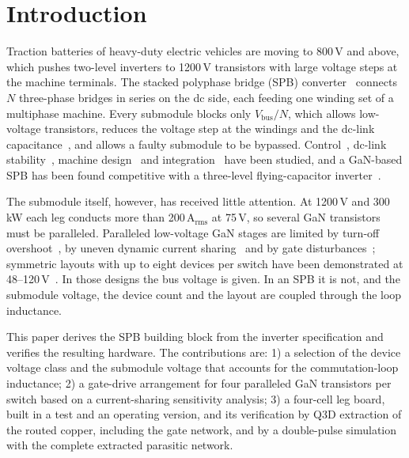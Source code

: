 \documentclass[conference]{IEEEtran}
\begin{document}
\section{Introduction}
Traction batteries of heavy-duty electric vehicles are moving to 800\,V and above, which pushes two-level inverters to 1200\,V transistors with large voltage steps at the machine terminals. The stacked polyphase bridge (SPB) converter~\cite{norrga2013,jin2014} connects $N$ three-phase bridges in series on the dc side, each feeding one winding set of a multiphase machine. Every submodule blocks only $V_\mathrm{bus}/N$, which allows low-voltage transistors, reduces the voltage step at the windings and the dc-link capacitance~\cite{jin2017,bringezu2023}, and allows a faulty submodule to be bypassed. Control~\cite{jin2014,verkroost2024}, dc-link stability~\cite{nikouie2017tpel}, machine design~\cite{zhang2014,bringezu2020} and integration~\cite{nikouie2017} have been studied, and a GaN-based SPB has been found competitive with a three-level flying-capacitor inverter~\cite{rohner2024}.

The submodule itself, however, has received little attention. At 1200\,V and 300\,kW each leg conducts more than 200\,A$_\mathrm{rms}$ at 75\,V, so several GaN transistors must be paralleled. Paralleled low-voltage GaN stages are limited by turn-off overshoot~\cite{brothers2019}, by uneven dynamic current sharing~\cite{lu2017,tran2025} and by gate disturbances~\cite{musumeci2022}; symmetric layouts with up to eight devices per switch have been demonstrated at 48--120\,V~\cite{wattenberg2023,cooke2026}. In those designs the bus voltage is given. In an SPB it is not, and the submodule voltage, the device count and the layout are coupled through the loop inductance.

This paper derives the SPB building block from the inverter specification and verifies the resulting hardware. The contributions are: 1) a selection of the device voltage class and the submodule voltage that accounts for the commutation-loop inductance; 2) a gate-drive arrangement for four paralleled GaN transistors per switch based on a current-sharing sensitivity analysis; 3) a four-cell leg board, built in a test and an operating version, and its verification by Q3D extraction of the routed copper, including the gate network, and by a double-pulse simulation with the complete extracted parasitic network.

\end{document}
